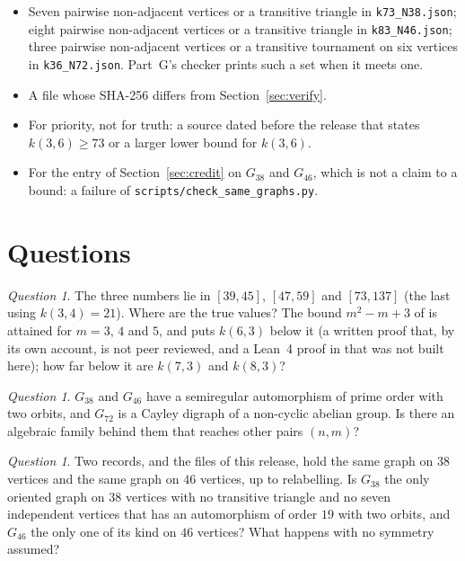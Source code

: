 \documentclass[11pt]{amsart}
\theoremstyle{plain}
\theoremstyle{definition}
\theoremstyle{remark}
\newtheorem{question}[theorem]{Question}
\begin{document}
\begin{itemize}
\item Seven pairwise non-adjacent vertices or a transitive triangle in \texttt{k73\_N38.json}; eight
pairwise non-adjacent vertices or a transitive triangle in \texttt{k83\_N46.json}; three pairwise
non-adjacent vertices or a transitive tournament on six vertices in \texttt{k36\_N72.json}. Part~G's
checker prints such a set when it meets one.
\item A file whose SHA-256 differs from Section~\ref{sec:verify}.
\item For priority, not for truth: a source dated before the release that states $k(3,6)\geq 73$ or
a larger lower bound for $k(3,6)$.
\item For the entry of Section~\ref{sec:credit} on $G_{38}$ and $G_{46}$, which is not a claim to a
bound: a failure of \texttt{scripts/check\_same\_graphs.py}.
\end{itemize}

\section{Questions}\label{sec:questions}

\begin{question}
The three numbers lie in $[39,45]$, $[47,59]$ and $[73,137]$ (the last using $k(3,4)=21$). Where
are the true values? The bound $m^2-m+3$ of \cite{IRW21} is attained for $m=3$, $4$ and $5$, and
\cite{Orden} puts $k(6,3)$ below it (a written proof that, by its own account, is not peer
reviewed, and a Lean~4 proof in \cite{OrdenLean} that was not built here); how far below it are
$k(7,3)$ and $k(8,3)$?
\end{question}

\begin{question}
$G_{38}$ and $G_{46}$ have a semiregular automorphism of prime order with two orbits, and $G_{72}$
is a Cayley digraph of a non-cyclic abelian group. Is there an algebraic family behind them that
reaches other pairs $(n,m)$?
\end{question}

\begin{question}
Two records, \cite{Orden2} and the files of this release, hold the same graph on $38$ vertices and
the same graph on $46$ vertices, up to relabelling. Is $G_{38}$ the only oriented graph on $38$
vertices with no transitive triangle and no seven independent vertices that has an automorphism of
order $19$ with two orbits, and $G_{46}$ the only one of its kind on $46$ vertices? What happens
with no symmetry assumed?
\end{question}
\end{document}
